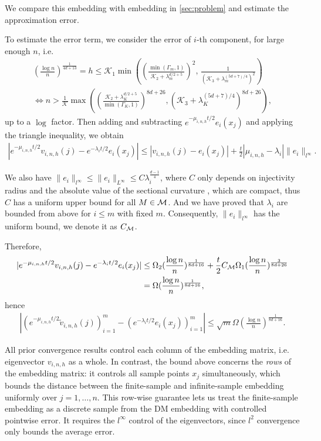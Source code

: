 We compare this embedding with embedding in \cref{sec:problem} and estimate the approximation error. 

To estimate the error term, we consider the error of $i$-th component, for large enough $n$, i.e. 
\begin{align}
	(\frac{\log n}{n})^{\frac{1}{4d+13}} = h \leq \mathcal{K}_1 \min \left(\left(\frac{\min(\mathsf\Gamma_m,1)}{\mathcal{K}_2+\lambda_m^{d/2+5}}\right)^2,\, \frac{1}{(\mathcal{K}_3+\lambda_m^{(5d+7)/4})^2}\right)\\
	\iff n > \frac{1}{\mathcal{K}} \max \left(\left(\frac{\mathcal{K}_2+\lambda_K^{d/2+5}}{\min(\mathsf\Gamma_K,1)}\right)^{8d+26},  (\mathcal{K}_3+\lambda_K^{(5d+7)/4})^{8d+26}\right),
\end{align}
up to a $\log$ factor.
Then adding and subtracting $e^{-\mu_{i,n,h}t/2}e_i(x_j)$ and applying the triangle inequality, we obtain
\begin{align}
	|e^{-\mu_{i,n,h}t/2}v_{i,n,h}(j)-e^{-\lambda_it/2}e_i(x_j)| 
	\leq |v_{i,n,h}(j)-e_i(x_j)| + \frac{t}{2}|\mu_{i,n,h}-\lambda_i| \|e_i\|_{l^\infty}.
\end{align}

We also have $\|e_i\|_{l^\infty} \leq \|e_i\|_{L^\infty} \leq C \lambda_{i}^{\frac{d-1}{4}}$,
where $C$ only depends on injectivity radius and the absolute value of the sectional curvature \cite{ajm/1154098927}, which are compact, thus $C$ has a uniform upper bound for all $M\in \mathcal{M}$. And we have proved that $\lambda_{i}$ are bounded from above for $i\leq m$ with fixed $m$. Consequently, $\|e_i\|_{l^\infty}$ has the uniform bound, we denote it as $C_{\mathcal{M}}$.

Therefore,
\begin{align}
	|e^{-\mu_{i,n,h}t/2}v_{i,n,h}(j)-e^{-\lambda_it/2}e_i(x_j)| &\leq \Omega_2 (\frac{\log n}{n})^{\frac{1}{8d+16}} + \frac{t}{2} C_{\mathcal{M}} \Omega_1 (\frac{\log n}{n})^{\frac{3}{8d+26}} \\
	&= \Omega (\frac{\log n}{n})^{\frac{1}{8d+16}},
\end{align}
hence
\begin{align}
|\left(e^{-\mu_{i,n,h}t/2}\tilde{v}_{i,n,h}(j)\right)_{i=1}^m - \left(e^{-\lambda_it/2}e_i(x_j)\right)_{i=1}^m| \leq \sqrt{m}\Omega (\frac{\log n}{n})^{\frac{1}{8d+16}}.
\end{align}

All prior convergence results control each column of the embedding matrix, i.e. eigenvector $v_{i,n,h}$ as a whole. In contrast, the bound above concerns the \textit{rows} of the embedding matrix: it controls all sample points $x_j$ simultaneously, which bounds the distance between the finite-sample and infinite-sample embedding uniformly over $j=1,\dots,n$. This row-wise guarantee lets us treat the finite-sample embedding as a discrete sample from the DM embedding with controlled pointwise error. It requires the $l^\infty$ control of the eigenvectors, since $l^2$ convergence only bounds the average error.

